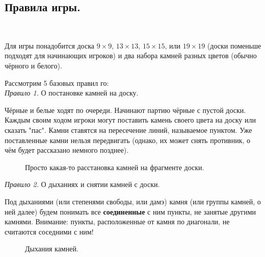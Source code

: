 \documentclass[14pt,a4paper]{extarticle}
\newcommand{\stone}[3]{\filldraw[color=black, fill=#3, very thick](#1,#2) circle(0.45);}
\newcommand{\territory}[3]{\filldraw[color=black, fill=#3, very thick](#1, #2) circle(0.125);}
\begin{document}
\subsection*{Правила игры.}
\




Для игры понадобится доска $9\times9$, $13\times13$, $15\times15$, или $19\times19$ (доски поменьше подходят для начинающих игроков) и два набора камней разных цветов (обычно чёрного и белого).

Рассмотрим 5 базовых правил го:\\

\textit{Правило 1.} О постановке камней на доску.

Чёрные и белые ходят по очереди. Начинают партию чёрные с пустой доски. Каждым своим ходом игроки могут поставить камень своего цвета на доску или сказать "пас". Камни ставятся на пересечение линий, называемое пунктом. Уже поставленные камни нельзя передвигать (однако, их может снять противник, о чём будет рассказано немного позднее).

\begin{figure}[h]
    \centering
    \caption{Просто какая-то расстановка камней на фрагменте доски.} \label{1}
\end{figure}

\textit{Правило 2.} О дыханиях и снятии камней с доски.

Под дыханиями (или степенями свободы, или дамэ) камня (или группы камней, о ней далее) будем понимать все \textbf{соединенные} с ним пункты, не занятые другими камнями. Внимание: пункты, расположенные от камня по диагонали, не считаются соседними с ним!


\newpage


\begin{figure}[h!]
    \centering
    \caption{Дыхания камней.} \label{2}
\end{figure}
\end{document}
